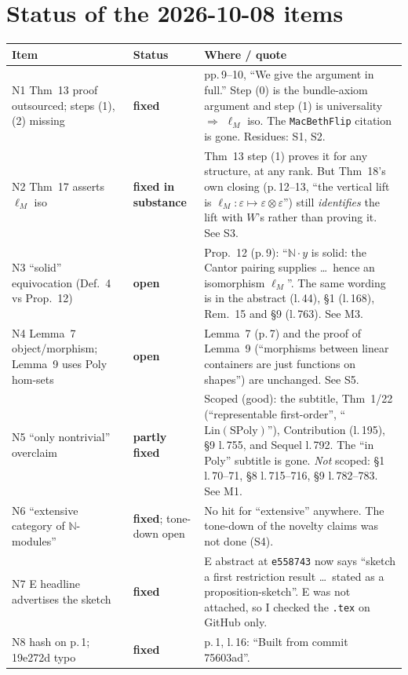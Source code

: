 \documentclass[11pt]{article}
\newcommand{\N}{\mathbb{N}}
\begin{document}
\section{Status of the 2026-10-08 items}
\begin{center}\small
\begin{tabular}{p{3.6cm}p{2.0cm}p{9.6cm}}
\toprule
Item & Status & Where / quote\\\midrule
N1 Thm~13 proof outsourced; steps (1),(2) missing & \textbf{fixed} &
pp.\,9--10, ``We give the argument in full.'' Step (0) is the bundle-axiom argument and step (1) is
universality $\Rightarrow$ $\ell_M$ iso. The \texttt{MacBethFlip} citation is gone. Residues: S1, S2.\\
N2 Thm~17 asserts $\ell_M$ iso & \textbf{fixed in substance} & Thm~13 step (1) proves it for any
structure, at any rank. But Thm~18's own closing (p.\,12--13, ``the vertical lift is
$\ell_M:\varepsilon\mapsto\varepsilon\otimes\varepsilon$'') still \emph{identifies} the lift with
$W$'s rather than proving it. See S3.\\
N3 ``solid'' equivocation (Def.~4 vs Prop.~12) & \textbf{open} & Prop.~12 (p.\,9): ``$\N\cdot y$
is solid: the Cantor pairing supplies \dots\ hence an isomorphism $\ell_M$''. The same wording is in
the abstract (l.\,44), \S1 (l.\,168), Rem.~15 and \S9 (l.\,763). See M3.\\
N4 Lemma~7 object/morphism; Lemma~9 uses Poly hom-sets & \textbf{open} & Lemma~7 (p.\,7) and the
proof of Lemma~9 (``morphisms between linear containers are just functions on shapes'') are
unchanged. See S5.\\
N5 ``only nontrivial'' overclaim & \textbf{partly fixed} & Scoped (good): the subtitle, Thm~1/22
(``representable first-order'', ``$\mathrm{Lin}(\mathrm{SPoly})$''), Contribution (l.\,195),
\S9 l.\,755, and Sequel l.\,792. The ``in Poly'' subtitle is gone. \emph{Not} scoped: \S1
l.\,70--71, \S8 l.\,715--716, \S9 l.\,782--783. See M1.\\
N6 ``extensive category of $\N$-modules'' & \textbf{fixed}; tone-down open & No hit for
``extensive'' anywhere. The tone-down of the novelty claims was not done (S4).\\
N7 E headline advertises the sketch & \textbf{fixed} & E abstract at \texttt{e558743} now says
``sketch a first restriction result \dots\ stated as a proposition-sketch''. E was not attached, so
I checked the \texttt{.tex} on GitHub only.\\
N8 hash on p.\,1; 19e272d typo & \textbf{fixed} & p.\,1, l.\,16: ``Built from commit 75603ad''.

\end{tabular}
\end{center}
\end{document}
